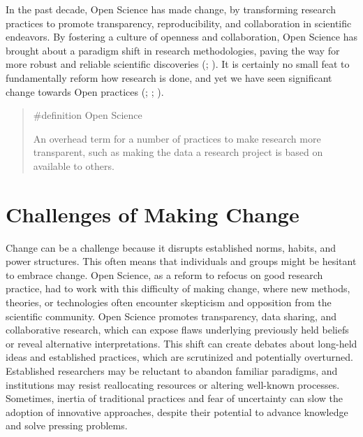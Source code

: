 \documentclass[
  letterpaper,
]{book}
\begin{document}
In the past decade, Open Science has made change, by transforming
research practices to promote transparency, reproducibility, and
collaboration in scientific endeavors. By fostering a culture of
openness and collaboration, Open Science has brought about a paradigm
shift in research methodologies, paving the way for more robust and
reliable scientific discoveries
(;
). It is
certainly no small feat to fundamentally reform how research is done,
and yet we have seen significant change towards Open practices
(;
;
).

\begin{quote}
\label{def-openscience}{\#definition} Open Science

An overhead term for a number of practices to make research more
transparent, such as making the data a research project is based on
available to others.
\end{quote}

\section*{Challenges of Making
Change}\label{challenges-of-making-change}


Change can be a challenge because it disrupts established norms, habits,
and power structures. This often means that individuals and groups might
be hesitant to embrace change. Open Science, as a reform to refocus on
good research practice, had to work with this difficulty of making
change, where new methods, theories, or technologies often encounter
skepticism and opposition from the scientific community. Open Science
promotes transparency, data sharing, and collaborative research, which
can expose flaws underlying previously held beliefs or reveal
alternative interpretations. This shift can create debates about
long-held ideas and established practices, which are scrutinized and
potentially overturned. Established researchers may be reluctant to
abandon familiar paradigms, and institutions may resist reallocating
resources or altering well-known processes. Sometimes, inertia of
traditional practices and fear of uncertainty can slow the adoption of
innovative approaches, despite their potential to advance knowledge and
solve pressing problems.
\end{document}

